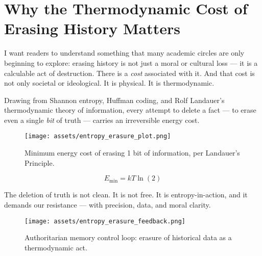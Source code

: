 \chapter{Why the Thermodynamic Cost of Erasing History Matters}

I want readers to understand something that many academic circles are only beginning to explore: erasing history is not just a moral or cultural loss — it is a calculable act of destruction. There is a \textit{cost} associated with it. And that cost is not only societal or ideological. It is physical. It is thermodynamic.

Drawing from Shannon entropy, Huffman coding, and Rolf Landauer’s thermodynamic theory of information, every attempt to delete a fact — to erase even a single \textit{bit} of truth — carries an irreversible energy cost.

\begin{figure}[h]
\centering
\texttt{[image: assets/entropy\_erasure\_plot.png]}
\caption{Minimum energy cost of erasing 1 bit of information, per Landauer's Principle.}
\end{figure}

\[
E_{\text{min}} = kT \ln(2)
\]

The deletion of truth is not clean. It is not free. It is entropy-in-action, and it demands our resistance — with precision, data, and moral clarity.

\begin{figure}[h]
\centering
\texttt{[image: assets/entropy\_erasure\_feedback.png]}
\caption{Authoritarian memory control loop: erasure of historical data as a thermodynamic act.}
\end{figure}

